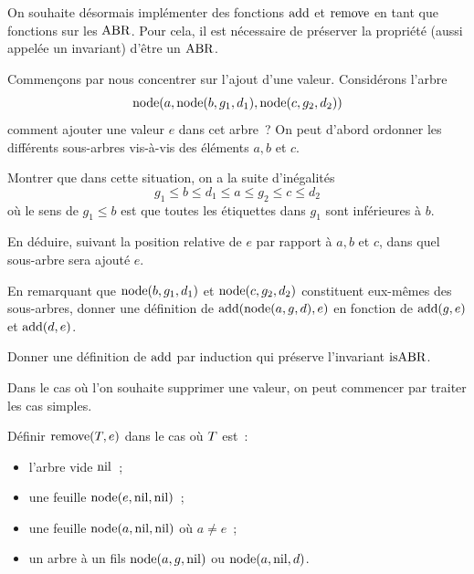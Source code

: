 \begin{problem}
  \noindent
  On souhaite désormais implémenter des fonctions $\operatorname{add}$ et $\operatorname{remove}$ en tant
  que fonctions sur
  les $\operatorname{ABR}$. Pour cela, il est nécessaire de préserver la propriété (aussi
  appelée un invariant) d'être un $\operatorname{ABR}$.


  \noindent
  Commençons par nous concentrer sur l'ajout d'une valeur. Considérons l'arbre
  \[\operatorname{node}(a,\operatorname{node}(b,g_1,d_1),\operatorname{node}(c,g_2,d_2))\]
  comment ajouter une valeur
  $e$ dans cet arbre~? On peut d'abord ordonner les différents sous-arbres
  vis-à-vis des éléments $a,b$ et $c$.
  \begin{pbQuest}
  \item Montrer que dans cette situation, on a la suite d'inégalités
    \[g_1 \leq b \leq d_1 \leq a \leq g_2 \leq c \leq d_2\]
    où le sens de  $g_1 \leq b$ est que toutes les étiquettes
    dans $g_1$ sont inférieures à $b$.
  \item En déduire, suivant la position relative de $e$ par rapport à
    $a,b$ et $c$, dans quel sous-arbre sera ajouté $e$.
  \item En remarquant que $\operatorname{node}(b,g_1,d_1)$ et $\operatorname{node}(c,g_2,d_2)$ constituent
    eux-mêmes des sous-arbres, donner une définition de
    $\operatorname{add}(\operatorname{node}(a,g,d),e)$ en fonction de $\operatorname{add}(g,e)$ et $\operatorname{add}(d,e)$.
  \item Donner une définition de $\operatorname{add}$ par induction qui préserve l'invariant
    $\operatorname{isABR}$.
  \end{pbQuest}


  \noindent
  Dans le cas où l'on souhaite supprimer une valeur, on peut commencer par
  traiter les cas simples.
  \begin{pbQuest}
  \item Définir $\operatorname{remove}(T,e)$ dans le cas où $T$ est~:
    \begin{itemize}
    \item l'arbre vide $\operatorname{nil}$~;
    \item une feuille $\operatorname{node}(e,\operatorname{nil},\operatorname{nil})$~;
    \item une feuille $\operatorname{node}(a,\operatorname{nil},\operatorname{nil})$ où $a \neq e$~;
    \item un arbre à un fils $\operatorname{node}(a,g,\operatorname{nil})$ ou $\operatorname{node}(a,\operatorname{nil},d)$.
    \end{itemize}
  \end{pbQuest}


\end{problem}
